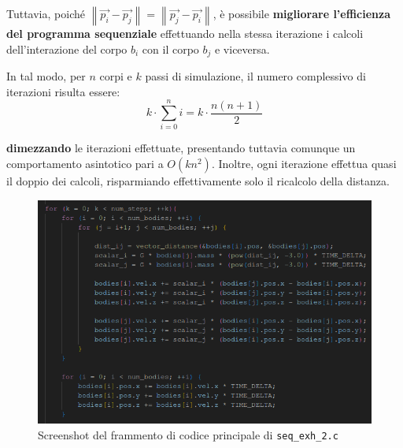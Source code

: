 \documentclass[12pt]{report}
\newcommand{\norm}[1]{\left\|#1\right\|}
\renewcommand\vec{\overrightarrow}
\begin{document}
    Tuttavia, poiché $\norm{\vec{p_i} - \vec{p_j}} = \norm{\vec{p_j} - \vec{p_i}}$, è possibile \textbf{migliorare l'efficienza del programma sequenziale} effettuando nella stessa iterazione i calcoli dell'interazione del corpo $b_i$ con il corpo $b_j$ e viceversa.

    In tal modo, per $n$ corpi e $k$ passi di simulazione, il numero complessivo di iterazioni risulta essere:
    \[k \cdot \sum_{i=0}^n i = k \cdot \frac{n(n+1)}{2}\] 

    \textbf{dimezzando} le iterazioni effettuate, presentando tuttavia comunque un  comportamento asintotico pari a $O(kn^2)$. Inoltre, ogni iterazione effettua quasi il doppio dei calcoli, risparmiando effettivamente solo il ricalcolo della distanza.

    \begin{figure}[H]
        \centering
        \includegraphics[width=\textwidth]{images/seq_exh_2.png}
        \caption{Screenshot del frammento di codice principale di \texttt{seq\_exh\_2.c}}
        \label{fig:seq_exh_2}
    \end{figure}
\end{document}
